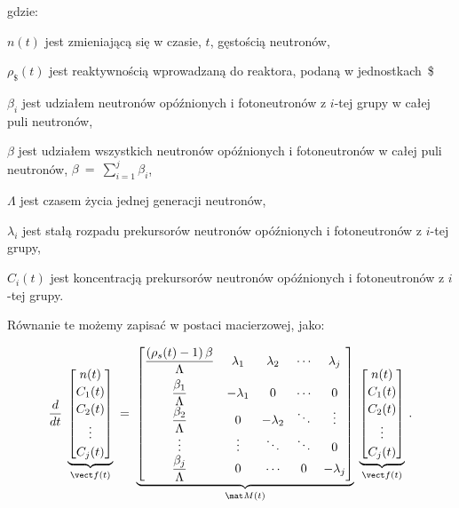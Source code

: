 \noindent gdzie:

\noindent $n(t)$  jest zmieniającą się w czasie, $t$, gęstością neutronów,

\noindent $\rho_{\$}(t)$  jest reaktywnością wprowadzaną do reaktora, podaną w jednostkach~\$


\noindent $\beta_i$  jest udziałem neutronów opóźnionych i fotoneutronów z $i$-tej grupy w całej puli neutronów, 

\noindent $\beta$   jest udziałem wszystkich neutronów opóźnionych i fotoneutronów w całej puli neutronów, $\beta~=~\sum\limits_{i=1}^j \beta_i$,

\noindent $\Lambda$  jest czasem życia jednej generacji neutronów,

\noindent $\lambda_i$   jest stałą rozpadu prekursorów neutronów opóźnionych i fotoneutronów z $i$-tej grupy,

\noindent $C_i(t)$ jest koncentracją prekursorów neutronów opóźnionych i fotoneutronów z $i$-tej grupy. 

Równanie te możemy zapisać w postaci macierzowej, jako: 


\[
\frac{d}{dt}\;
\underbrace{\begin{bmatrix}
		n(t)\\[2pt]
		C_{1}(t)\\[2pt]
		C_{2}(t)\\[2pt]
		\vdots\\[2pt]
		C_{j}(t)
\end{bmatrix}}_{\vect f(t)}
\;=\;
\underbrace{\begin{bmatrix}
		\dfrac{(\rho_s(t)-1)\,\beta}{\Lambda} & \lambda_1 & \lambda_2 & \cdots & \lambda_j\\[3mm]
		\dfrac{\beta_1}{\Lambda} & -\lambda_1 & 0 & \cdots & 0\\
		\dfrac{\beta_2}{\Lambda} & 0 & -\lambda_2 & \ddots & \vdots\\
		\vdots & \vdots & \ddots & \ddots & 0\\
		\dfrac{\beta_j}{\Lambda} & 0 & \cdots & 0 & -\lambda_j
\end{bmatrix}}_{\mat M(t)}
\;
\underbrace{\begin{bmatrix}
		n(t)\\[2pt]
		C_{1}(t)\\[2pt]
		C_{2}(t)\\[2pt]
		\vdots\\[2pt]
		C_{j}(t)
\end{bmatrix}}_{\vect f(t)}\,.
\]

